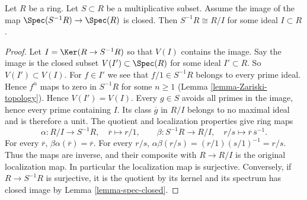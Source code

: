 \begin{lemma}
\label{lemma-invert-closed-quotient}
Let $R$ be a ring. Let $S \subset R$ be a multiplicative subset.
Assume the image of the map $\Spec(S^{-1}R) \to \Spec(R)$
is closed. Then $S^{-1}R \cong R/I$ for some ideal $I \subset R$.
\end{lemma}

\begin{proof}
Let $I = \Ker(R \to S^{-1}R)$ so that $V(I)$ contains the image.
Say the image is the closed subset $V(I') \subset \Spec(R)$ for
some ideal $I' \subset R$. So $V(I') \subset V(I)$.
For $f \in I'$ we see that $f/1 \in S^{-1}R$
belongs to every prime ideal. Hence $f^n$ maps to zero in $S^{-1}R$
for some $n \geq 1$ (Lemma \ref{lemma-Zariski-topology}).
Hence $V(I') = V(I)$.
Every $g\in S$ avoids all primes in the image, hence every prime
containing $I$. Its class $\overline g$ in $R/I$ belongs to no maximal
ideal and is therefore a unit. The quotient and localization properties
give ring maps
$$
\alpha:R/I\longrightarrow S^{-1}R,\quad \overline r\longmapsto r/1,
\qquad
\beta:S^{-1}R\longrightarrow R/I,\quad r/s\longmapsto
\overline r\,\overline s^{-1}.
$$
For every $\overline r$, $\beta\alpha(\overline r)=\overline r$.
For every $r/s$, $\alpha\beta(r/s)=(r/1)(s/1)^{-1}=r/s$.
Thus the maps are inverse, and their composite with $R\to R/I$
is the original localization map. In particular the localization map
is surjective. Conversely, if $R\to S^{-1}R$ is surjective, it is
the quotient by its kernel and its spectrum has closed image by
Lemma \ref{lemma-spec-closed}.
\end{proof}
